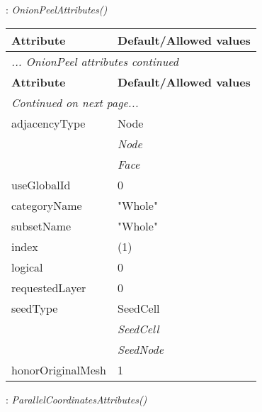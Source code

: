 \documentclass[10pt,a4paper]{report}
\begin{document}
\newpage

{}
: {\it OnionPeelAttributes() }\\[-3mm]

\begin{longtable}{ll}
{\bf Attribute} & {\bf Default/Allowed values} \\
\hline \hline
\endfirsthead
\multicolumn{2}{l}{{\it ... OnionPeel attributes continued}} \\
{\bf Attribute} & {\bf Default/Allowed values} \\
\hline \hline
\endhead
\hline
\multicolumn{2}{l}{{\it Continued on next page...}} \\
\endfoot
\hline
\endlastfoot

adjacencyType  &  Node   \\
 & {\it  Node} \\
 & {\it  Face} \\
useGlobalId  &  0 \\
categoryName  &  "Whole" \\
subsetName  &  "Whole" \\
index  &  (1) \\
logical  &  0 \\
requestedLayer  &  0 \\
seedType  &  SeedCell   \\
 & {\it  SeedCell} \\
 & {\it  SeedNode} \\
honorOriginalMesh  &  1 \\
\end{longtable}

\newpage

{}
: {\it ParallelCoordinatesAttributes() }\\[-3mm]
\end{document}
